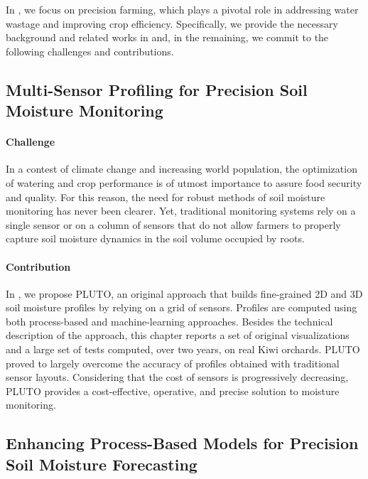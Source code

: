 In , we focus on precision farming, which plays a pivotal role in addressing water wastage and improving crop efficiency.
Specifically, we provide the necessary background and related works in  and, in the remaining, we commit to the following challenges and contributions.


\subsection*{Multi-Sensor Profiling for Precision Soil Moisture Monitoring}


\paragraph{Challenge}
In a contest of climate change and increasing world population, the optimization of watering and crop performance is of utmost importance to assure food security and quality.
For this reason, the need for robust methods of soil moisture monitoring has never been clearer.
Yet, traditional monitoring systems rely on a single sensor or on a column of sensors that do not allow farmers to properly capture soil moisture dynamics in the soil volume occupied by roots.


\paragraph{Contribution} In , we propose PLUTO, an original approach that builds fine-grained 2D and 3D soil moisture profiles by relying on a grid of sensors.
Profiles are computed using both process-based and machine-learning approaches.
Besides the technical description of the approach, this chapter reports a set of original visualizations and a large set of tests computed, over two years, on real Kiwi orchards.
PLUTO proved to largely overcome the accuracy of profiles obtained with traditional sensor layouts.
Considering that the cost of sensors is progressively decreasing, PLUTO provides a cost-effective, operative, and precise solution to moisture monitoring.


\subsection*{Enhancing Process-Based Models for Precision Soil Moisture Forecasting}

